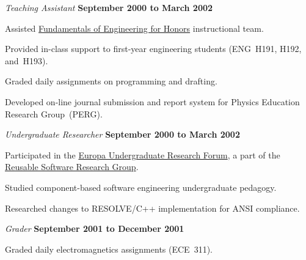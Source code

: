 \documentclass[10pt]{article}
\newenvironment{outerlist}[1][\enskip\textbullet]%
        {\begin{itemize}[#1]}{\end{itemize}%
         \vspace{-.6\baselineskip}}
\newenvironment{innerlist}[1][\enskip\textbullet]%
        {\begin{compactitem}[#1]}{\end{compactitem}}
\begin{document}
\begin{outerlist}
\item[] \textit{Teaching Assistant}%
        \hfill \textbf{September 2000 to March 2002}
\begin{innerlist}
\item Assisted \href{http://feh.eng.ohio-state.edu/}
                    {Fundamentals of Engineering for Honors}
      instructional team.
\item Provided in-class support to first-year engineering students
        (ENG~H191, H192, and~H193).
\item Graded daily assignments on programming and drafting.
\item Developed on-line journal submission and report system for Physics
        Education Research Group~(PERG).
\end{innerlist}

\item[] \textit{Undergraduate Researcher}%
        \hfill \textbf{September 2000 to March 2002}
\begin{innerlist}
\item Participated in the
        \href{http://www.cse.ohio-state.edu/europa/}{Europa
        Undergraduate Research Forum}, a part of the
        \href{http://www.cse.ohio-state.edu/rsrg/}{Reusable Software
        Research Group}.
\item Studied component-based software engineering undergraduate
        pedagogy.
\item Researched changes to RESOLVE/C++ implementation for ANSI
        compliance.
\end{innerlist}

\item[] \textit{Grader}%
        \hfill \textbf{September 2001 to December 2001}
\begin{innerlist}
\item Graded daily electromagnetics assignments (ECE~311).
\end{innerlist}
\end{outerlist}
\end{document}
